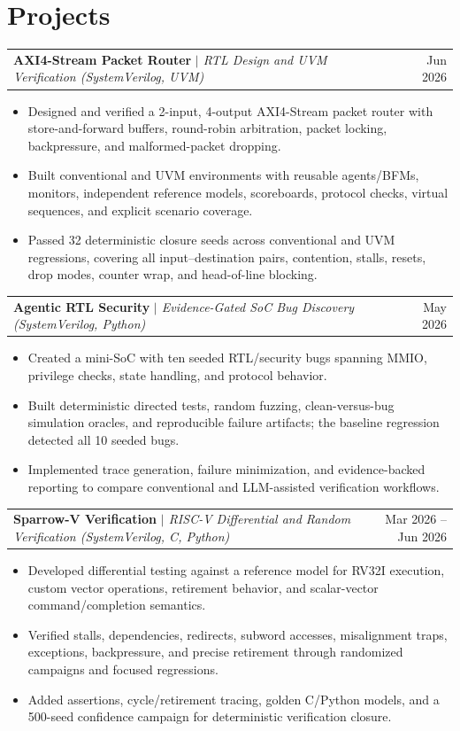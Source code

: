 \documentclass[10pt,letterpaper]{article}
\newcommand{\resumeItem}[1]{\item #1}
\newcommand{\resumeProjectHeading}[3]{%
  \begin{tabularx}{\textwidth}{X r}
    \textbf{#1} \textit{#2} & #3 \\
  \end{tabularx}\vspace{0pt}
}
\newenvironment{resumeItemList}{\begin{small}\begin{itemize}[leftmargin=*, itemsep=2pt, topsep=3pt, parsep=0pt]}{\end{itemize}\end{small}\vspace{4pt}}
\begin{document}
\section*{Projects}
\resumeProjectHeading{AXI4-Stream Packet Router}{$\mid$ RTL Design and UVM Verification (SystemVerilog, UVM)}{Jun 2026}
\begin{resumeItemList}
    \resumeItem{Designed and verified a 2-input, 4-output AXI4-Stream packet router with store-and-forward buffers, round-robin arbitration, packet locking, backpressure, and malformed-packet dropping.}
    \resumeItem{Built conventional and UVM environments with reusable agents/BFMs, monitors, independent reference models, scoreboards, protocol checks, virtual sequences, and explicit scenario coverage.}
    \resumeItem{Passed 32 deterministic closure seeds across conventional and UVM regressions, covering all input--destination pairs, contention, stalls, resets, drop modes, counter wrap, and head-of-line blocking.}
\end{resumeItemList}
\resumeProjectHeading{Agentic RTL Security}{$\mid$ Evidence-Gated SoC Bug Discovery (SystemVerilog, Python)}{May 2026}
\begin{resumeItemList}
    \resumeItem{Created a mini-SoC with ten seeded RTL/security bugs spanning MMIO, privilege checks, state handling, and protocol behavior.}
    \resumeItem{Built deterministic directed tests, random fuzzing, clean-versus-bug simulation oracles, and reproducible failure artifacts; the baseline regression detected all 10 seeded bugs.}
    \resumeItem{Implemented trace generation, failure minimization, and evidence-backed reporting to compare conventional and LLM-assisted verification workflows.}
\end{resumeItemList}
\resumeProjectHeading{Sparrow-V Verification}{$\mid$ RISC-V Differential and Random Verification (SystemVerilog, C, Python)}{Mar 2026 -- Jun 2026}
\begin{resumeItemList}
    \resumeItem{Developed differential testing against a reference model for RV32I execution, custom vector operations, retirement behavior, and scalar-vector command/completion semantics.}
    \resumeItem{Verified stalls, dependencies, redirects, subword accesses, misalignment traps, exceptions, backpressure, and precise retirement through randomized campaigns and focused regressions.}
    \resumeItem{Added assertions, cycle/retirement tracing, golden C/Python models, and a 500-seed confidence campaign for deterministic verification closure.}
\end{resumeItemList}
\vspace{-0.5em}
\end{document}
